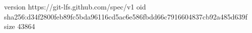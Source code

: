 version https://git-lfs.github.com/spec/v1
oid sha256:d34f2800feb89fc5bda96116cd5ac6e586fbdd66c7916604837cb92a485d639f
size 43864
